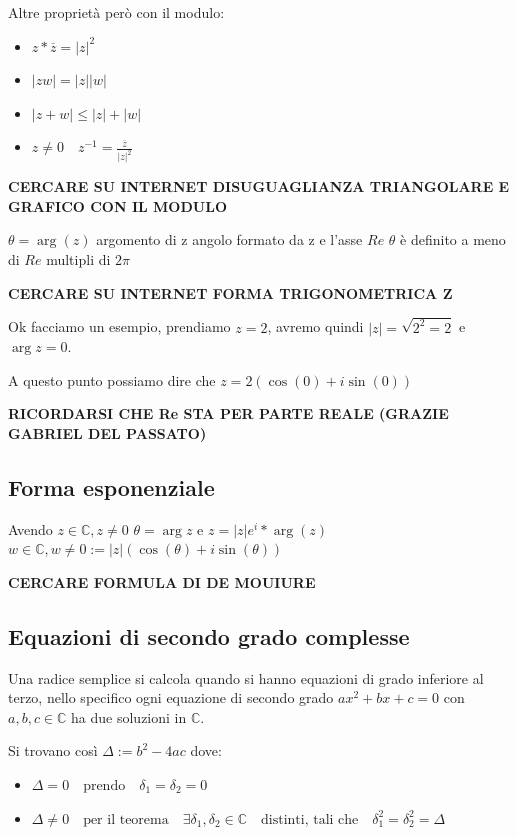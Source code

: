 \documentclass{article}
\begin{document}
Altre proprietà però con il modulo:
\begin{itemize}
        \item $z * \overline{z} =   |z|^{2}$ \\
        \item $|zw| = |z| |w|$ \\
        \item $|z+w| \le |z| + |w|$ \\
        \item $z \not = 0 \quad z^{-1} = \frac{\overline{z}}{|z|^{2}} $ \\
\end{itemize}

\textbf{CERCARE SU INTERNET DISUGUAGLIANZA TRIANGOLARE E GRAFICO CON IL MODULO} \newline

$\theta = \arg(z)$
argomento di z angolo formato da z e l'asse $Re$ $\theta$ è definito a meno di $Re$ multipli di $2\pi$

\textbf{CERCARE SU INTERNET FORMA TRIGONOMETRICA Z} \newline

Ok facciamo un esempio, prendiamo $z = 2$, avremo quindi $|z| = \sqrt{2^2 = 2}$ e $\arg{z} = 0$.\par
A questo punto possiamo dire che $z = 2(\cos(0) + i\sin(0))$ \newline

\textbf{RICORDARSI CHE Re STA PER PARTE REALE (GRAZIE GABRIEL DEL PASSATO)} \newline


\subsection{Forma esponenziale}
Avendo $z \in \mathbb{C}, z \not = 0$ \newline
$\theta = \arg z$ e  $z = | z | e^i*\arg(z)$ \newline
$w \in \mathbb{C}, w \not = 0 := |z| (\cos(\theta) + i\sin(\theta))$ \newline

\textbf{CERCARE FORMULA DI DE MOUIURE}


\subsection{Equazioni di secondo grado complesse}
Una radice semplice si calcola quando si hanno equazioni di grado inferiore al terzo, nello specifico ogni equazione di secondo grado $ax^2+bx+c = 0$ con $a,b,c \in \mathbb{C}$ ha due soluzioni in $\mathbb{C}$. \par
Si trovano così  $\Delta := b^2 - 4ac$ dove:
\begin{itemize}
        \item $\Delta = 0 \quad \mbox{prendo} \quad \delta_1 = \delta_2 = 0$	
        \item $\Delta \not = 0 \quad \mbox{per il teorema} \quad \exists \delta_1,\delta_2 \in \mathbb{C} \quad \mbox{distinti, tali che} \quad \delta_1^2 = \delta_2^2 = \Delta$	
\end{itemize}
\end{document}
